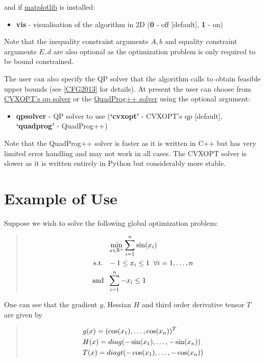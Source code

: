 \documentclass[letterpaper,11pt,openany,oneside]{sphinxmanual}
\begin{document}
and if \href{http://www.matplotlib.org/}{matplotlib} is installed:
\begin{itemize}
\item {} 
\textbf{vis} - visualisation of the algorithm in 2D (\textbf{0} - off {[}default{]}, \textbf{1} - on)

\end{itemize}

Note that the inequality constraint arguments \(A, b\) and  equality constraint arguments \(E, d\) are also optional as the optimization problem is only required to be bound constrained.

The user can also specify the QP solver that the algorithm calls to obtain feasible upper bounds (see {\hyperref[userguide:cfg2013]{{[}CFG2013{]}}} for details). At present the user can choose from \href{http://cvxopt.org/}{CVXOPT's qp solver} or the \href{http://github.com/mpy/PyQuadProg/}{QuadProg++ solver} using the optional argument:
\begin{itemize}
\item {} 
\textbf{qpsolver} - QP solver to use (\textbf{`cvxopt'} - CVXOPT's qp {[}default{]}, \textbf{`quadprog'} - QuadProg++)

\end{itemize}

Note that the QuadProg++ solver is faster as it is written in C++ but has very limited error handling and may not work in all cases. The CVXOPT solver is slower as it is written entirely in Python but considerably more stable.


\section{Example of Use}
\label{userguide:example-of-use}
Suppose we wish to solve the following global optimization problem:
\begin{quote}
\begin{gather}
\begin{split}&\min_{x \in \mathbb{R}^n} \sum_{i=1}^n \sin(x_i) \\
\text{s.t. } \; &-1 \le x_i \le 1 \; \; \forall i=1,\dotsc,n \\
\text{and }  \; &\sum_{i=1}^n -x_i \le 1\end{split}\notag
\end{gather}\end{quote}

One can see that the gradient \(g\), Hessian \(H\) and third order derivative tensor \(T\) are given by
\begin{quote}
\begin{gather}
\begin{split}&g(x) = ( \cos(x_1), \dotsc, \cos(x_n))^T \\
&H(x) = diag( -\sin(x_1), \dotsc, -\sin(x_n)) \\
&T(x) = diagt( -\cos(x_1), \dotsc, -\cos(x_n))\end{split}\notag
\end{gather}\end{quote}
\end{document}
